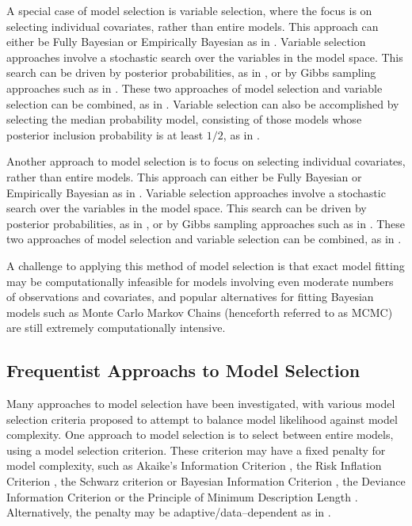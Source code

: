 A special case of model selection is variable selection, where the focus is on selecting individual
covariates, rather than entire models. This approach can either be Fully Bayesian or Empirically Bayesian as
in \citep{Cui2008}. Variable selection approaches involve a stochastic search over the variables in the model
space. This search can be driven by posterior probabilities, as in \citep{Casella2006}, or by Gibbs sampling
approaches such as in \citep{George1993}. These two approaches of model selection and variable selection can
be combined, as in \citep{Geweke1996}. Variable selection can also be accomplished by selecting the median
probability model, consisting of those models whose posterior inclusion probability is at least $1/2$, as in
\citep{Barbieri2004}.

Another approach to model selection is to focus on selecting individual covariates, rather than entire
models. This approach can either be Fully Bayesian or Empirically Bayesian as in \citep{Cui2008}. Variable
selection approaches involve a stochastic search over the variables in the model space. This search can be
driven by posterior probabilities, as in \citep{Casella2006}, or by Gibbs sampling approaches such as in
\citep{George1993}. These two approaches of model selection and variable selection can be combined, as in
\citep{Geweke1996}.

A challenge to applying this method of model selection is that exact model fitting may be computationally
infeasible for models involving even moderate numbers of observations and covariates, and popular alternatives
for fitting Bayesian models such as Monte Carlo Markov Chains (henceforth referred to as MCMC) are still
extremely computationally intensive.

\subsection{Frequentist Approachs to Model Selection}
Many approaches to model selection have been investigated, with various model selection criteria proposed to
attempt to balance model likelihood against model complexity. One approach to model selection is to select
between entire models, using a model selection criterion. These criterion may have a fixed penalty for model
complexity, such as Akaike's Information Criterion \cite{Akaike1974}, the Risk Inflation Criterion
\cite{Foster1994}, the Schwarz criterion or Bayesian Information Criterion \cite{Schwarz1978}, the Deviance
Information Criterion \cite{Spiegelhalter2016} or the Principle of Minimum Description Length
\cite{Hansen2001}. Alternatively, the penalty may be adaptive/data--dependent as in \cite{George2000}.

